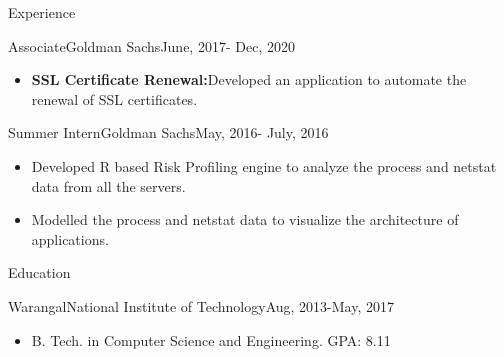 \documentclass[]{mcdowellcv}
\begin{document}
\begin{cvsection}{Experience}
\begin{cvsubsection}{Associate}{Goldman Sachs}{June, 2017- Dec, 2020}
\begin{itemize}
\begin{itemize}
        	\item [$\bullet$]Developed REST services to onboard new teams for centralized authentication.
		    \item [$\bullet$]Completed a smooth migration of authentication services to a new and improved infrastructure, which involved collaboration with 25 teams.
		    \item [$\bullet$]Upgraded internet facing applications for authentication with Apache(httpd), Tomcat, improved security for cookies, protected pages from enumeration, introduced Rate Limiting and fixed security risks around authentication.
		   \end{itemize}
            \item \textbf{SSL Certificate Renewal:}Developed an application to automate the renewal of SSL certificates.
            
		\end{itemize}
	\end{cvsubsection}
	\begin{cvsubsection}{Summer Intern}{Goldman Sachs}{May, 2016- July, 2016}
		            
		\begin{itemize}%
			\item Developed R based Risk Profiling engine to analyze the process and netstat data from all the servers.
			\item Modelled the process and netstat data to visualize the architecture of applications.
		\end{itemize}
	\end{cvsubsection}
\end{cvsection}
\begin{cvsection}{Education}
	\begin{cvsubsection}{Warangal}{National Institute of Technology}{Aug, 2013-May, 2017}
		\begin{itemize}
			\item B. Tech. in Computer Science and Engineering. GPA: 8.11
		\end{itemize}
	\end{cvsubsection}
\end{cvsection}
\end{document}
